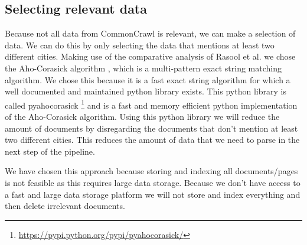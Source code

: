 \subsection{Selecting relevant data}
Because not all data from  CommonCrawl is relevant, we can make a selection of data. We can do this by only selecting the data that mentions at least two different cities. Making use of the comparative analysis of Rasool et al. \cite{rasool2012string} we chose the Aho-Corasick algorithm \cite{Aho-Corasick}, which is a multi-pattern exact string matching algorithm. We chose this because it is a fast exact string algorithm for which a well documented and maintained python library exists. This python library is called pyahocorasick \footnote{\url{https://pypi.python.org/pypi/pyahocorasick/}}  and is a fast and memory efficient python implementation of the Aho-Corasick algorithm. Using this python library we will reduce the amount of documents by disregarding the documents that don't mention at least two different cities. This reduces the amount of data that we need to parse in the next step of the pipeline.

We have chosen this approach because storing and indexing all documents/pages is not feasible as this requires large data storage. Because we don't have access to a fast and large data storage platform we will not store and index everything and then delete irrelevant documents.


